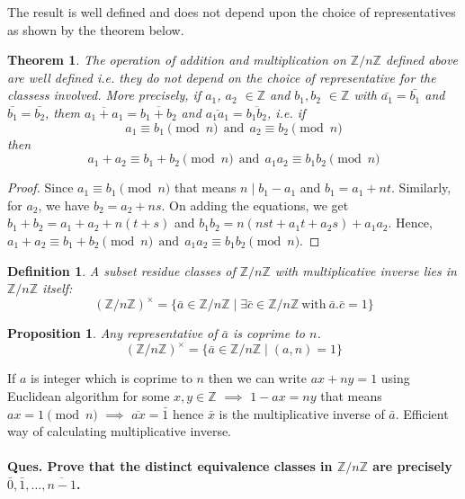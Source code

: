 \documentclass[12pt]{report}
\newtheorem{thm}{Theorem}
\newtheorem{defn}{Definition}
\newtheorem{prop}{Proposition}
\begin{document}
The result is well defined and does not depend upon the choice of representatives as shown by the theorem below.
\begin{thm}
    The operation of addition and multiplication on $\mathbb{Z}/n\mathbb{Z}$ defined above are well defined i.e. they do not depend on the choice of representative for the classess involved. More precisely, if $a_1$, $a_2$ $\in \mathbb{Z}$ and $b_1, b_2$ $\in \mathbb{Z}$ with $\bar{a_1} = \bar{b_1}$ and $\bar{b_1} = \bar{b_2}$, them $\overline{a_1 + a_1} = \overline{b_1 + b_2}$ and $\overline{a_1a_1} = \overline{b_1b_2}$, i.e. if 
    $$ a_1 \equiv b_1 \pmod n~~\text{and}~~a_2 \equiv b_2 \pmod n $$
    then 
    $$ a_1 + a_2 \equiv b_1 + b_2 \pmod n~~\text{and}~~ a_1a_2 \equiv b_1b_2 \pmod n $$
\end{thm}
\begin{proof}
    Since $a_1 \equiv b_1 \pmod n$ that means $n \mid b_1 - a_1$ and $ b_1 = a_1 + nt$. Similarly, for $a_2$, we have $ b_2 = a_2 + ns$. On adding the equations, we get $ b_1 + b_2 = a_1 + a_2 + n(t+s)$ and $b_1b_2 = n(nst + a_1t + a_2s) + a_1a_2 $. Hence, $a_1 + a_2 \equiv b_1 + b_2 \pmod n~~\text{and}~~ a_1a_2 \equiv b_1b_2 \pmod n$.
\end{proof}
\begin{defn}
    A subset residue classes of $\mathbb{Z}/n\mathbb{Z}$ with multiplicative inverse lies in $\mathbb{Z}/n\mathbb{Z}$ itself:
    $$ (\mathbb{Z}/n\mathbb{Z})^{\times} = \{ \bar{a} \in \mathbb{Z}/n\mathbb{Z} \mid \exists \bar{c} \in \mathbb{Z}/n\mathbb{Z} ~\text{with}~ \bar{a}.\bar{c} = 1\} $$
\end{defn}
\begin{prop}
    Any representative of $\bar{a}$ is coprime to $n$.
    $$(\mathbb{Z}/n\mathbb{Z})^{\times} = \{\bar{a} \in \mathbb{Z}/n\mathbb{Z} \mid (a,n) = 1\}$$
\end{prop}
If $a$ is integer which is coprime to $n$ then we can write $ax + ny = 1$ using Euclidean algorithm for some $x,y \in \mathbb{Z}$ $\implies$ $1 - ax = ny$ that means $ax = 1 \pmod n$ $ \implies$ $\overline{ax} = \bar{1}$ hence $\bar{x}$ is the multiplicative inverse of $\bar{a}$. Efficient way of calculating multiplicative inverse.
\paragraph*{Ques. Prove that the distinct equivalence classes in $\mathbb{Z}/n\mathbb{Z}$ are precisely $\bar{0}, \bar{1}, \dots, \overline{n-1}$.}
\end{document}
